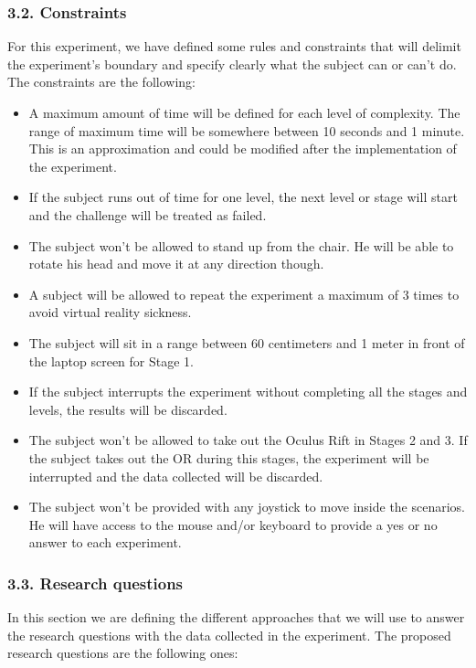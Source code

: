 \subsubsection{3.2. Constraints}\label{constraints}

For this experiment, we have defined some rules and constraints that
will delimit the experiment's boundary and specify clearly what the
subject can or can't do. The constraints are the following:

\begin{itemize}
\item
  A maximum amount of time will be defined for each level of complexity.
  The range of maximum time will be somewhere between 10 seconds and 1
  minute. This is an approximation and could be modified after the
  implementation of the experiment.
\item
  If the subject runs out of time for one level, the next level or stage
  will start and the challenge will be treated as failed.
\item
  The subject won't be allowed to stand up from the chair. He will be
  able to rotate his head and move it at any direction though.
\item
  A subject will be allowed to repeat the experiment a maximum of 3
  times to avoid virtual reality sickness.
\item
  The subject will sit in a range between 60 centimeters and 1 meter in
  front of the laptop screen for Stage 1.
\item
  If the subject interrupts the experiment without completing all the
  stages and levels, the results will be discarded.
\item
  The subject won't be allowed to take out the Oculus Rift in Stages 2
  and 3. If the subject takes out the OR during this stages, the
  experiment will be interrupted and the data collected will be
  discarded.
\item
  The subject won't be provided with any joystick to move inside the
  scenarios. He will have access to the mouse and/or keyboard to provide
  a yes or no answer to each experiment.
\end{itemize}

\subsubsection{3.3. Research questions}\label{research-questions}

In this section we are defining the different approaches that we will
use to answer the research questions with the data collected in the
experiment. The proposed research questions are the following ones:


